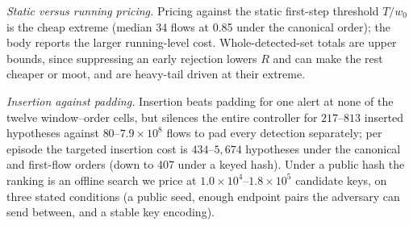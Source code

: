 \documentclass[conference]{IEEEtran}
\newcommand{\Cal}{\mathcal{C}}
\newcommand{\nCal}{\lvert\Cal\rvert}
\begin{document}
\emph{Static versus running pricing.} Pricing against the static first-step threshold $T/w_0$ is the
cheap extreme (median 34 flows at 0.85 under the canonical order); the body reports the larger
running-level cost. Whole-detected-set totals are upper bounds, since suppressing an early rejection
lowers $R$ and can make the rest cheaper or moot, and are heavy-tail driven at their extreme.

\emph{Insertion against padding.} Insertion beats padding for one alert at none of the twelve
window--order cells, but silences the entire controller for $217$--$813$ inserted hypotheses against
$80$--$7.9\times10^{8}$ flows to pad every detection separately; per episode the targeted insertion cost
is $434$--$5{,}674$ hypotheses under the canonical and first-flow orders (down to 407 under a keyed hash).
Under a public hash the ranking is an offline search we price at
$1.0\times10^{4}$--$1.8\times10^{5}$ candidate keys, on three stated conditions (a public seed, enough
endpoint pairs the adversary can send between, and a stable key encoding).








\begin{table}[t]
\centering
\caption{Pre-committed weight schemes at the primary window, LOND, $\gamma \propto j^{-1.6}$, mean over
two detector seeds. $T = 57{,}368$ episodes, 275 malicious, $\nCal = 2{,}448{,}993$. $L^{*}$ is quoted at
the unperturbed level and is therefore an upper bound. All counts here use the \textbf{first-flow}
within-bucket order, the optimistic upper bound over the orders we audit, not the canonical
metadata-hash order \cref{tab:main} reports (\cref{apptab:ordering}); both legs of every comparison use
it, so the order moves the level and not the ranking.}
\label{tab:asym}
\end{table}
\end{document}
